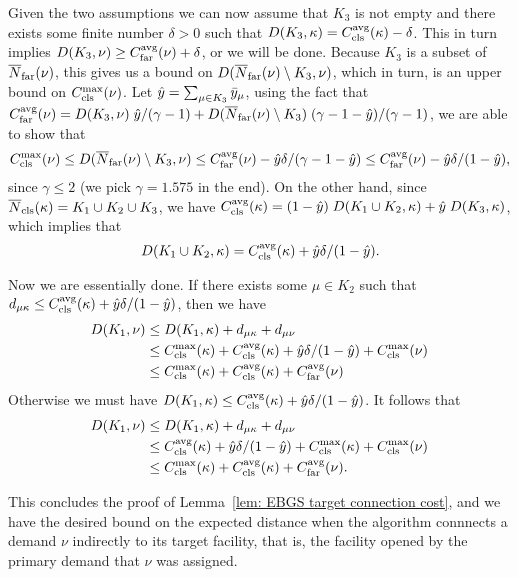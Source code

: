 \documentclass[11pt]{article}
\begin{document}
  Given the two assumptions we can now assume that $K_3$ is not empty
  and there exists some finite number $\delta > 0$ such that $D(K_3,
  \kappa) = \clsdist(\kappa) - \delta$. This in turn implies $D(K_3,
  \nu) \geq \fardist(\nu) + \delta$, or we will be done. Because $K_3$
  is a subset of $\wbarfarnb(\nu)$, this gives us a bound on
  $D(\wbarfarnb(\nu) \setminus K_3, \nu)$, which in turn, is an upper
  bound on $\clsmax(\nu)$. Let $\hat{y} = \sum_{\mu\in K_3}
  \bary_{\mu}$, using the fact that $\fardist(\nu) = D(K_3,\nu)\;
  \hat{y}/(\gamma-1) + D(\wbarfarnb(\nu)\setminus K_3)\;
  (\gamma-1-\hat{y})/(\gamma-1)$, we are able to show that
  \begin{equation*}
    \clsmax(\nu) \leq D(\wbarfarnb(\nu) \setminus K_3, \nu) \leq \fardist(\nu) -
    \hat{y}\delta/(\gamma-1-\hat{y}) \leq \fardist(\nu) -
    \hat{y}\delta/(1-\hat{y}),
  \end{equation*}
  since $\gamma \leq 2$ (we pick $\gamma=1.575$ in the end). On the
  other hand, since $\wbarclsnb(\kappa) = K_1 \cup K_2 \cup K_3$, we
  have $\clsdist(\kappa) = (1-\hat{y})\; D(K_1\cup K_2, \kappa) +
  \hat{y}\; D(K_3, \kappa)$, which implies that
  \begin{equation*}
    D(K_1 \cup K_2, \kappa) = \clsdist(\kappa) + \hat{y}\delta/(1-\hat{y}).
  \end{equation*}

  Now we are essentially done. If there exists some $\mu \in K_2$ such
  that $d_{\mu\kappa} \leq \clsdist(\kappa) +
  \hat{y}\delta/(1-\hat{y})$, then we have
  \begin{align*}
    D(K_1, \nu) &\leq D(K_1, \kappa) + d_{\mu\kappa} + d_{\mu\nu} \\
    &\leq \clsmax(\kappa) + \clsdist(\kappa) +
    \hat{y}\delta/(1-\hat{y})
    + \clsmax(\nu)\\
    &\leq \clsmax(\kappa) + \clsdist(\kappa) + \fardist(\nu)
  \end{align*}
  Otherwise we must have $D(K_1, \kappa) \leq \clsdist(\kappa) +
  \hat{y}\delta/(1-\hat{y})$. It follows that
  \begin{align*}
    D(K_1, \nu) &\leq D(K_1, \kappa) + d_{\mu\kappa} + d_{\mu\nu} \\
    &\leq \clsdist(\kappa) + \hat{y}\delta/(1-\hat{y}) +
    \clsmax(\kappa)
    + \clsmax(\nu)\\
    &\leq \clsmax(\kappa) + \clsdist(\kappa) + \fardist(\nu).
  \end{align*}

  This concludes the proof of Lemma~\ref{lem: EBGS target connection
    cost}, and we have the desired bound on the expected distance when
  the algorithm connnects a demand $\nu$ indirectly to its target
  facility, that is, the facility opened by the primary demand that
  $\nu$ was assigned.
\end{document}
